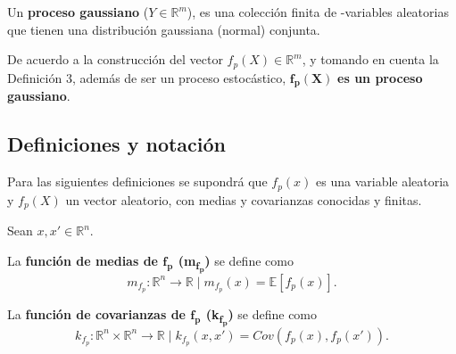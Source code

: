 \begin{defin}
    Un \textbf{proceso gaussiano} ($Y \in \mathbb{R}^m$), es una colección finita de -variables aleatorias que tienen una distribución gaussiana (normal) conjunta.
\end{defin}

\begin{obs*}
    De acuerdo a la construcci\'on del vector $f_p(X) \in \mathbb{R}^m$, y tomando en cuenta la Definici\'on 3, además de ser un proceso estoc\'astico, $\bm{f_p(X)}$ \textbf{es un proceso gaussiano}.
\end{obs*}


\subsection{Definiciones y notaci\'on}

Para las siguientes definiciones se supondrá que $f_p(x)$ es una variable aleatoria y $f_p(X)$ un vector aleatorio, con medias y covarianzas conocidas y finitas.

\begin{defin*}
Sean $x,x' \in \mathbb{R}^n$.

La \textbf{función de medias de $\bm{f_p}$ (m\textsubscript{$\bm{f_p}$})} se define como 
\begin{equation*}
    m_{f_p}: \mathbb{R}^n \rightarrow \mathbb{R} 
    \mid
    m_{f_p}(x) = \mathbb{E}[f_p(x)].
\end{equation*}

La \textbf{función de covarianzas de $\bm{f_p}$ (k\textsubscript{$\bm{f_p}$})} se define como 
\begin{equation*}
    k_{f_p}: \mathbb{R}^n \times \mathbb{R}^n \rightarrow \mathbb{R} 
    \mid
    k_{f_p}(x, x') = Cov({f_p}(x),{f_p}(x')).
\end{equation*}
\end{defin*}

